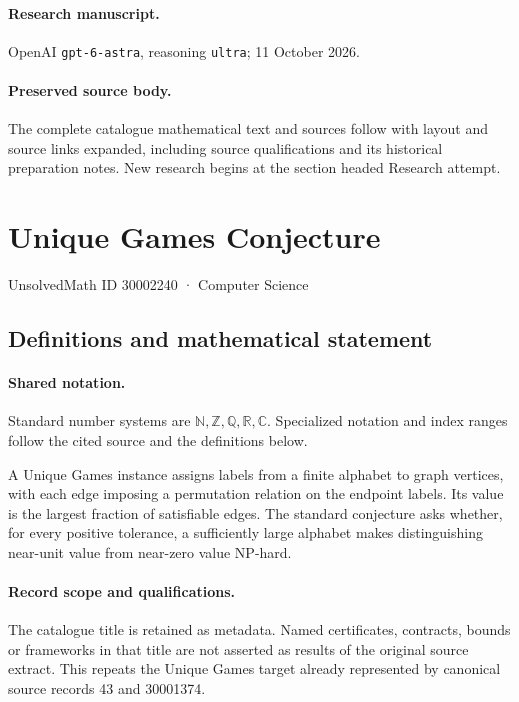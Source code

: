 \documentclass[11pt]{article}
\begin{document}
\paragraph{Research manuscript.} OpenAI \texttt{gpt-6-astra}, reasoning \texttt{ultra}; 11 October 2026.
\paragraph{Preserved source body.} The complete catalogue mathematical text and sources follow with layout and source links expanded, including source qualifications and its historical preparation notes. New research begins at the section headed Research attempt.

\section{Unique Games Conjecture}\label{30002240}
{\small UnsolvedMath ID 30002240 · Computer Science}
\subsection{Definitions and mathematical statement}

\paragraph{Shared notation.}Standard number systems are $\mathbb N,\mathbb Z,\mathbb Q,\mathbb R,\mathbb C$. Specialized notation and index ranges follow the cited source and the definitions below.


A Unique Games instance assigns labels from a finite alphabet to graph vertices, with each edge imposing a permutation relation on the endpoint labels. Its value is the largest fraction of satisfiable edges. The standard conjecture asks whether, for every positive tolerance, a sufficiently large alphabet makes distinguishing near-unit value from near-zero value NP-hard.
\paragraph{Record scope and qualifications.}
The catalogue title is retained as metadata. Named certificates, contracts, bounds or frameworks in that title are not asserted as results of the original source extract.
This repeats the Unique Games target already represented by canonical source records 43 and 30001374.
\end{document}
